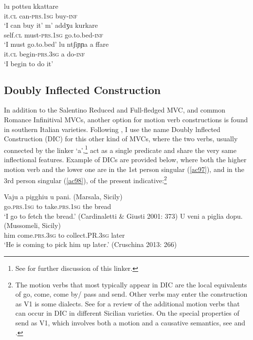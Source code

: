 \documentclass[output=paper]{langscibook}
\begin{document}
\ea \label{ac96}
    \ea \gll lu      pottsu     kkattare\\
    it.\textsc{cl} can-\textsc{prs}.\textsc{1sg} buy-\textsc{inf}\\
    \glt `I can buy it'
    \ex \gll m’    addʒu      kurkare\\
    self.\textsc{cl}  must-\textsc{prs}.\textsc{1sg}   go.to.bed-\textsc{inf} \\
    \glt `I must go.to.bed'
    \ex \gll lu ntʃiɲɲa       a  ffare\\
    it.\textsc{cl} begin-\textsc{prs}.\textsc{3sg} a  do-\textsc{inf} \\
    \glt `I begin to do it'
    \z
\z

\subsection{Doubly Inflected Construction}

In addition to the Salentino Reduced and Full-fledged MVC, and common Romance Infinitival MVCs, another option for motion verb constructions is found in southern Italian varieties. Following \citet{cruschina2013a}, I use the name Doubly lnflected Construction (DIC) for this other kind of MVCs, where the two verbs, usually connected by the linker ‘a’,\footnote{See \citet{calabrese2021a} for further discussion of this linker.}  act as a single predicate and share the very same inflectional features. Example of DICs are provided below, where both the higher motion verb and the lower one are in the 1st person singular (\ref{ac97}), and in the 3rd person singular (\ref{ac98}), of the present indicative:\footnote{The motion verbs that most typically appear in DIC are the local equivalents of go, come, come by/ pass and send. Other verbs may enter the construction as V1 is some dialects. See \citet{caro2018a, caro2019a} for a review of the additional motion verbs that can occur in DIC in different Sicilian varieties. On the special properties of send as V1, which involves both a motion and a causative semantics, see \citet{todaro2018a} and \citet{prete2020a}.}

\ea \label{ac97}
\gll Vaju    a   pigghiu    u   pani.    (Marsala, Sicily)\\
   go.\textsc{prs}.\textsc{1sg} to   take.\textsc{prs}.\textsc{1sg}  the  bread \\
 \glt  ‘I go to fetch the bread.’ \hfill (Cardinaletti \& Giusti 2001: 373)
\ex \label{ac98}
\gll  U   veni      a  piglia   dopu.      (Mussomeli, Sicily)\\
   him  come.\textsc{prs}.\textsc{3sg}  to  collect.PR.\textsc{3sg} later\\
\glt   ‘He is coming to pick him up later.’ \hfill  (Cruschina 2013: 266)
\z
\end{document}
